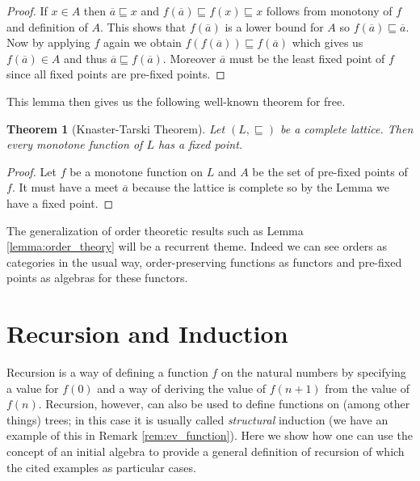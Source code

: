 \documentclass[letterpaper, 11pt, oneside]{memoir}
\theoremstyle{myteo}
\newtheorem{theorem}{Theorem}[section]
\numberwithin{equation}{section}
\begin{document}
\begin{proof}
  If \(x \in A\) then \(\overline{a} \sqsubseteq x\) and \(f(\overline{a}) \sqsubseteq f(x) \sqsubseteq x\) follows from monotony of \(f\) and definition of \(A\).
  This shows that \(f(\overline{a})\) is a lower bound for \(A\) so \(f(\overline{a}) \sqsubseteq \overline{a}\).
  Now by applying \(f\) again we obtain \(f(f(\overline{a})) \sqsubseteq f(\overline{a})\) which gives us \(f(\overline{a}) \in A\) and thus \(\overline{a} \sqsubseteq f(\overline{a})\).
  Moreover \(\overline{a}\) must be the least fixed point of \(f\) since all fixed points are pre-fixed points.
\end{proof}

This lemma then gives us the following well-known theorem for free.

\begin{theorem}[Knaster-Tarski Theorem]
  \label{teo:knaster_tarski}
  Let \((L, \sqsubseteq)\) be a complete lattice.
  Then every monotone function of \(L\) has a fixed point.
\end{theorem}

\begin{proof}
  Let \(f\) be a monotone function on \(L\) and \(A\) be the set of pre-fixed points of \(f\).
  It must have a meet \(\overline{a}\) because the lattice is complete so by the Lemma we have a fixed point.
\end{proof}

The generalization of order theoretic results such as Lemma \ref{lemma:order_theory} will be a recurrent theme.
Indeed we can see orders as categories in the usual way, order-preserving functions as functors and pre-fixed points as algebras for these functors.

\section{Recursion and Induction}
\label{sec:recursion_and_induction}

Recursion is a way of defining a function \(f\) on the natural numbers by specifying a value for \(f(0)\) and a way of deriving the value of \(f(n + 1)\) from the value of \(f(n)\).
Recursion, however, can also be used to define functions on (among other things) trees; in this case it is usually called \emph{structural} induction (we have an example of this in Remark \ref{rem:ev_function}).
Here we show how one can use the concept of an initial algebra to provide a general definition of recursion of which the cited examples as particular cases.
\end{document}
